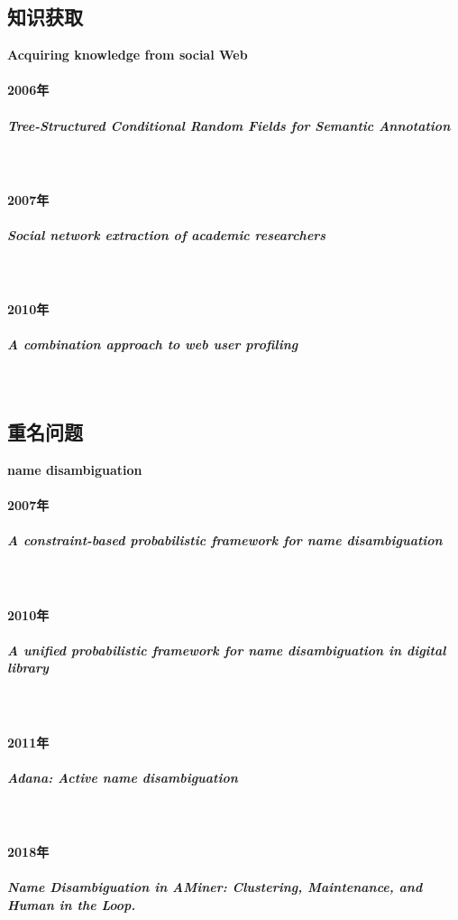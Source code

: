 \documentclass[UTF8]{ctexrep}
\begin{document}

\subsection{知识获取}
\textbf{Acquiring knowledge from social Web}

\paragraph{2006年}
\subparagraph{Tree-Structured Conditional Random Fields for
Semantic Annotation}~\cite{tang2006tree}


\paragraph{2007年}
\subparagraph{Social network extraction of academic researchers}~\cite{tang2007social}


\paragraph{2010年}
\subparagraph{A combination approach to web user profiling}~\cite{tang2010combination}


\subsection{重名问题}
\textbf{name disambiguation}

\paragraph{2007年}
\subparagraph{A constraint-based probabilistic framework for name disambiguation}~\cite{zhang2007constraint}


\paragraph{2010年}
\subparagraph{A unified probabilistic framework for name disambiguation in digital library}~\cite{tang2011unified}


\paragraph{2011年}
\subparagraph{Adana: Active name disambiguation}~\cite{wang2011adana}


\paragraph{2018年}
\subparagraph{Name Disambiguation in AMiner: Clustering, Maintenance, and Human in the Loop.}~\cite{zhang2018name}
\end{document}
